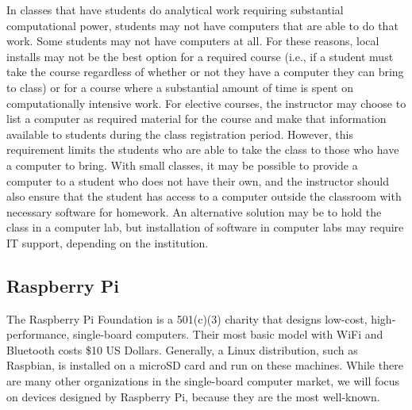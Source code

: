 In classes that have students do analytical work requiring substantial computational power, students may not have computers that are able to do that work. Some students may not have computers at all. For these reasons, local installs may not be the best option for a required course (i.e., if a student must take the course regardless of whether or not they have a computer they can bring to class) or for a course where a substantial amount of time is spent on computationally intensive work. For elective courses, the instructor may choose to list a computer as required material for the course and make that information available to students during the class registration period. However, this requirement limits the students who are able to take the class to those who have a computer to bring. With small classes, it may be possible to provide a computer to a student who does not have their own, and the instructor should also ensure that the student has access to a computer outside the classroom with necessary software for homework. An alternative solution may be to hold the class in a computer lab, but installation of software in computer labs may require IT support, depending on the institution.

\subsection{Raspberry Pi}\label{RaspberryPi}


The Raspberry Pi Foundation is a 501(c)(3) charity that
designs low-cost, high-performance, single-board computers.
Their most basic model with WiFi and Bluetooth costs \$10 US Dollars.
Generally, a Linux distribution, such as Raspbian, is installed
on a microSD card and run on these machines.
While there are many other organizations in the single-board computer market,
we will focus on devices designed by Raspberry Pi, because they  are the most
well-known.

